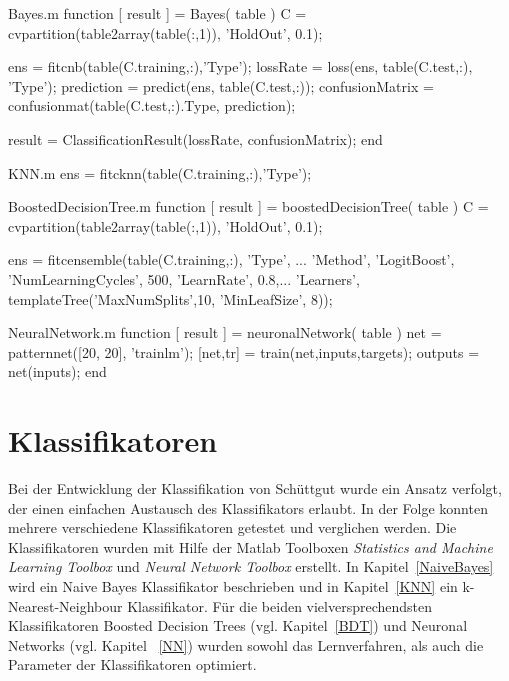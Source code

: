 \lstset{
  style              = Matlab-editor,
  basicstyle         = \mlttfamily,
  escapechar         = ",
  mlshowsectionrules = true,
}

\begin{filecontents*}{Bayes.m}
function [ result ] = Bayes( table )
    C = cvpartition(table2array(table(:,1)), 'HoldOut', 0.1);

    ens = fitcnb(table(C.training,:),'Type');
    lossRate = loss(ens, table(C.test,:), 'Type');
    prediction = predict(ens, table(C.test,:));
    confusionMatrix = confusionmat(table(C.test,:).Type, prediction);

    result = ClassificationResult(lossRate, confusionMatrix);
end
\end{filecontents*}

\begin{filecontents*}{KNN.m}
    ens = fitcknn(table(C.training,:),'Type');
\end{filecontents*}

\begin{filecontents*}{BoostedDecisionTree.m}
function [ result ] = boostedDecisionTree( table )
    C = cvpartition(table2array(table(:,1)), 'HoldOut', 0.1);

    ens = fitcensemble(table(C.training,:), 'Type', ...
        'Method', 'LogitBoost', 'NumLearningCycles', 500, 'LearnRate', 0.8,...
        'Learners', templateTree('MaxNumSplits',10, 'MinLeafSize', 8));
\end{filecontents*}

\begin{filecontents*}{NeuralNetwork.m}
function [ result ] = neuronalNetwork( table )
    net = patternnet([20, 20], 'trainlm');    
    [net,tr] = train(net,inputs,targets);    
    outputs = net(inputs);
end
\end{filecontents*}

\section{Klassifikatoren} \label{Klassifikatoren}
Bei der Entwicklung der Klassifikation von Schüttgut wurde ein Ansatz verfolgt, der einen einfachen Austausch des Klassifikators erlaubt. In der Folge konnten mehrere verschiedene Klassifikatoren getestet und verglichen werden. Die Klassifikatoren wurden mit Hilfe der Matlab Toolboxen \textit{Statistics and Machine Learning Toolbox} \cite{MLToolbox} und \textit{Neural Network Toolbox} \cite{NNToolbox} erstellt. In Kapitel~\ref{NaiveBayes} wird ein Naive Bayes Klassifikator beschrieben und in Kapitel~\ref{KNN} ein k-Nearest-Neighbour Klassifikator. Für die beiden vielversprechendsten Klassifikatoren Boosted Decision Trees (vgl. Kapitel~\ref{BDT}) und Neuronal Networks (vgl. Kapitel ~\ref{NN}) wurden sowohl das Lernverfahren, als auch die Parameter der Klassifikatoren optimiert.

